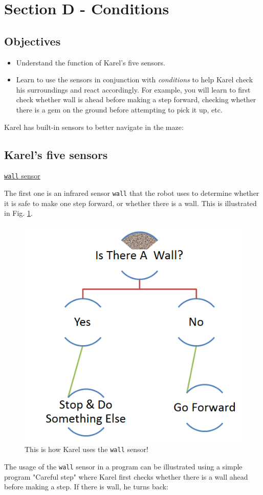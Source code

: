 {{{{%

\section{Section D - Conditions} \label{sec:cond}

\subsection{Objectives} 

\begin{itemize}
\item Understand the function of Karel's five sensors.
\item Learn to use the sensors in conjunction with {\em conditions} to help Karel 
      check his surroundings and react accordingly. For example, you will learn to first 
      check whether wall is ahead before making a step forward, checking whether there
      is a gem on the ground before attempting to pick it up, etc.
\end{itemize}

\noindent
Karel has built-in sensors to better navigate in the maze:

\subsection{Karel's five sensors}

\noindent
\underline{{\tt wall} sensor}

The first one is an infrared sensor {\tt wall} that the robot uses to determine 
whether it is safe to make one step forward, or whether there is a wall. This is 
illustrated in Fig. \ref{fig:dede-ifelse}.

\begin{figure}[!ht]
\begin{center}
\includegraphics[height=0.5\textwidth]{imgk/salih-ifelse.png}
\end{center}
\vspace{-4mm}
\caption{This is how Karel uses the {\tt wall} sensor!}
\label{fig:dede-ifelse}
\end{figure}
\noindent
The usage of the {\tt wall} sensor in a program can be illustrated using a simple program "Careful step" 
where Karel first checks whether there is a wall ahead before
making a step. If there is wall, he turns back: 

}}}}
